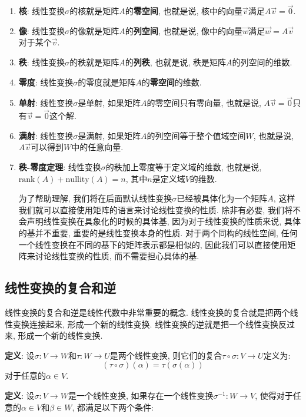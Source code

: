 \documentclass{ctexart}
\begin{document}
\begin{enumerate}
\item \textbf{核}: 线性变换$\sigma$的核就是矩阵$A$的\textbf{零空间}, 也就是说, 核中的向量$\vec{v}$满足$A\vec{v} = \vec{0}$.
\item \textbf{像}: 线性变换$\sigma$的像就是矩阵$A$的\textbf{列空间}, 也就是说, 像中的向量$\vec{w}$满足$\vec{w} = A\vec{v}$对于某个$\vec{v}$.
\item \textbf{秩}: 线性变换$\sigma$的秩就是矩阵$A$的\textbf{列秩}, 也就是说, 秩是矩阵$A$的列空间的维数.
\item \textbf{零度}: 线性变换$\sigma$的零度就是矩阵$A$的\textbf{零空间}的维数.
\item \textbf{单射}: 线性变换$\sigma$是单射, 如果矩阵$A$的零空间只有零向量, 也就是说, $A\vec{v} = \vec{0}$只有$\vec{v} = \vec{0}$这个解.
\item \textbf{满射}: 线性变换$\sigma$是满射, 如果矩阵$A$的列空间等于整个值域空间$W$, 也就是说, $A\vec{v}$可以得到$W$中的任意向量.
\item \textbf{秩-零度定理}: 线性变换$\sigma$的秩加上零度等于定义域的维数, 也就是说, $\text{rank}(A) + \text{nullity}(A) = n$, 其中$n$是定义域$V$的维数.
   
为了帮助理解, 我们将在后面默认线性变换$\sigma$已经被具体化为一个矩阵$A$, 这样我们就可以直接使用矩阵的语言来讨论线性变换的性质. 除非有必要, 我们将不会声明线性变换在具象化的时候的具体基, 因为对于线性变换的性质来说, 具体的基并不重要, 重要的是线性变换本身的性质. 对于两个同构的线性空间, 任何一个线性变换在不同的基下的矩阵表示都是相似的, 因此我们可以直接使用矩阵来讨论线性变换的性质, 而不需要担心具体的基.
\end{enumerate}

\subsection{线性变换的复合和逆}

线性变换的复合和逆是线性代数中非常重要的概念. 线性变换的复合就是把两个线性变换连接起来, 形成一个新的线性变换. 线性变换的逆就是把一个线性变换反过来, 形成一个新的线性变换.

\textbf{定义}: 设$\sigma: V \to W$和$\tau: W \to U$是两个线性变换, 则它们的复合$\tau \circ \sigma: V \to U$定义为:
$$(\tau \circ \sigma)(\alpha) = \tau(\sigma(\alpha))$$
对于任意的$\alpha \in V$.

\textbf{定义}: 设$\sigma: V \to W$是一个线性变换, 如果存在一个线性变换$\sigma^{-1}: W \to V$, 使得对于任意的$\alpha \in V$和$\beta \in W$, 都满足以下两个条件:
\end{document}

